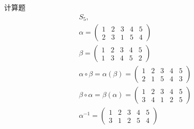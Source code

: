 \documentclass[12pt, a4paper]{article}  %
\begin{document}
计算题
\begin{align}
    &S_5,\\
    &\alpha =\begin{pmatrix}
        1&2& 3& 4& 5\\
        2& 3 &1 &5& 4
        \end{pmatrix}\\
    &\beta =\begin{pmatrix}
        1&2& 3& 4& 5\\
        1&3&4&5&2
    \end{pmatrix}\\
    &\alpha\circ \beta=\alpha(\beta)=\begin{pmatrix}
        1&2& 3& 4& 5\\
        2&1&5&4&3
    \end{pmatrix}\\
    &\beta\circ \alpha=\beta(\alpha)=\begin{pmatrix}
        1&2& 3& 4& 5\\
        3&4&1&2&5
    \end{pmatrix}\\
    &\alpha^{-1}=\begin{pmatrix}
        1&2& 3& 4& 5\\
       3& 1 &2 &5& 4
    \end{pmatrix}\\
\end{align}
\end{document}
